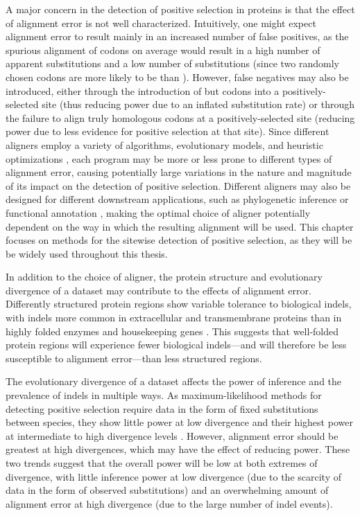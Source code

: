 A major concern in the detection of positive selection in proteins is
that the effect of alignment error is not well
characterized. Intuitively, one might expect alignment error to result
mainly in an increased number of false positives, as the spurious
alignment of \nh codons on average would result in a high number of
apparent \nsyn substitutions and a low number of \syn substitutions
(since two randomly chosen codons are more likely to be \nsyn than
\syn).  However, false negatives may also be introduced, either
through the introduction of \syn but \nh codons into a
positively-selected site (thus reducing power due to an inflated \syn
substitution rate) or through the failure to align truly homologous
codons at a positively-selected site (reducing power due to less
evidence for positive selection at that site).  Since different
aligners employ a variety of algorithms, evolutionary models, and
heuristic optimizations \citep{Notredame2007Recent}, each program may
be more or less prone to different types of alignment error, causing
potentially large variations in the nature and magnitude of its impact
on the detection of positive selection. Different aligners may also be
designed for different downstream applications, such as phylogenetic
inference or functional annotation \citep{Morrison2009}, making the
optimal choice of aligner potentially dependent on the way in which
the resulting alignment will be used. This chapter focuses on methods
for the sitewise detection of positive selection, as they will be be
widely used throughout this thesis.
 
In addition to the choice of aligner, the protein structure and
evolutionary divergence of a dataset may contribute to the effects of
alignment error. Differently structured protein regions show variable
tolerance to biological indels, with indels more common in
extracellular and transmembrane proteins than in highly folded enzymes
and housekeeping genes \citep{delaChaux2007DNA}. This suggests that
well-folded protein regions will experience fewer biological
indels---and will therefore be less susceptible to alignment
error---than less structured regions.

The evolutionary divergence of a dataset affects the power of \sw
inference and the prevalence of indels in multiple ways. As
maximum-likelihood methods for detecting positive selection require
data in the form of fixed substitutions between species, they show
little power at low divergence and their highest power at intermediate
to high divergence levels \citep{Anisimova2001}. However, alignment
error should be greatest at high divergences, which may have the
effect of reducing power. These two trends suggest that the overall
power will be low at both extremes of divergence, with little
inference power at low divergence (due to the scarcity of data in the
form of observed substitutions) and an overwhelming amount of
alignment error at high divergence (due to the large number of indel
events).

